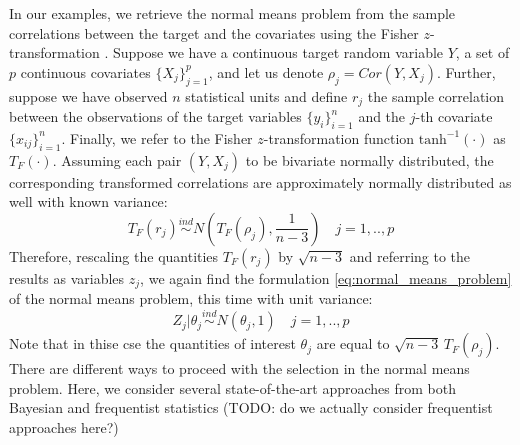 \documentclass[american,]{article}
\theoremstyle{definition}
\begin{document}
In our examples, we retrieve the normal means problem from the sample correlations between the target and the covariates using the Fisher $z$-transformation \citep{hawkins1989using}. Suppose we have a continuous target random variable $Y$, a set of $p$ continuous covariates $\{X_{j}\}_{j=1}^{p}$, and let us denote $\rho_{j}=Cor(Y,X_{j})$. Further, suppose we have observed $n$ statistical units and define $r_{j}$ the sample correlation between the observations of the target variables $\{y_{i}\}_{i=1}^{n}$ and the $j$-th covariate $\{x_{ij}\}_{i=1}^{n}$. Finally, we refer to the Fisher $z$-transformation function $\text{tanh}^{-1}(\cdot)$ as $T_{F}(\cdot)$. Assuming each pair $(Y,X_{j})$ to be bivariate normally distributed, the corresponding transformed correlations are approximately normally distributed as well with known variance:
\
\begin{equation} \label{eq:fisher_transformation}
T_{F}(r_{j})\overset{ind}{\sim} N(T_{F}(\rho_{j}),\frac{1}{n-3}) \quad j=1,..,p
\end{equation}
Therefore, rescaling the quantities $T_{F}(r_{j})$ by $\sqrt{n-3}$ and referring to the results as variables $z_{j}$, we again find the formulation \eqref{eq:normal_means_problem} of the normal means problem, this time with unit variance:
\
\begin{equation} \label{eq:normal_means_problem2}
Z_{j}|\theta_{j}\overset{ind}{\sim}N(\theta_{j},1) \quad j=1,..,p
\end{equation}
Note that in thise cse the quantities of interest $\theta_{j}$ are equal to $\sqrt{n-3}\,T_{F}(\rho_{j})$. There are different ways to proceed with the selection in the normal means problem. Here, we consider several state-of-the-art approaches from both Bayesian and frequentist statistics (TODO: do we actually consider frequentist approaches here?) 
\end{document}

